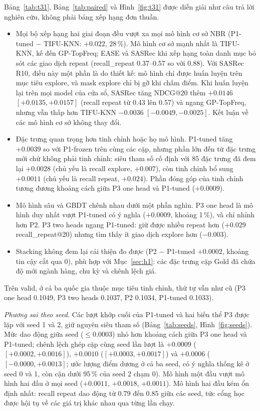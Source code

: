 \documentclass[jtehm]{ieeeaccess}
\begin{document}
Bảng~\ref{tab:t31}, Bảng~\ref{tab:paired} và Hình~\ref{fig:t31} được diễn giải như câu trả lời nghiên cứu, không phải bảng xếp hạng đơn thuần.
\begin{itemize}
\item Mọi bộ xếp hạng hai giai đoạn đều vượt xa mọi mô hình cơ sở NBR (P1-tuned $-$ TIFU-KNN: $+0.022$, 28\,\%). Mô hình cơ sở mạnh nhất là TIFU-KNN, kế đến GP-TopFreq; EASE và SASRec khi xếp hạng toàn danh mục bỏ sót các giao dịch repeat (recall\_repeat 0.37--0.57 so với 0.88). Với SASRec R10, điều này một phần là do thiết kế: mô hình chỉ được huấn luyện trên mục tiêu explore, và mask explore chỉ bị gỡ khi chấm điểm. Khi huấn luyện lại trên mọi model của cửa sổ, SASRec tăng NDCG@20 thêm $+0.0146$ $[+0.0135, +0.0157]$ (recall repeat từ 0.43 lên 0.57) và ngang GP-TopFreq, nhưng vẫn thấp hơn TIFU-KNN $-0.0036$ $[-0.0049, -0.0025]$. Kết luận về các mô hình cơ sở không thay đổi.
\item Đặc trưng quan trọng hơn tinh chỉnh hoặc họ mô hình. P1-tuned tăng $+0.0039$ so với P1-frozen trên cùng các cặp, nhưng phần lớn đến từ đặc trưng mới chứ không phải tinh chỉnh: siêu tham số cố định với 85 đặc trưng đã đem lại $+0.0028$ (chủ yếu là recall explore, $+0.007$), còn tinh chỉnh bổ sung $+0.0011$ (chủ yếu là recall repeat, $+0.024$). Phần đóng góp của tinh chỉnh tương đương khoảng cách giữa P3 one head và P1-tuned ($+0.0009$).
\item Mô hình sâu và GBDT chênh nhau dưới một phần nghìn. P3 one head là mô hình duy nhất vượt P1-tuned có ý nghĩa ($+0.0009$, khoảng 1\,\%), và chỉ nhỉnh hơn P2. P3 two heads ngang P1-tuned: giữ được nhiều repeat hơn ($+0.029$ recall\_repeat@20) nhưng tìm thấy ít giao dịch explore hơn ($-0.003$).
\item Stacking không đem lại cải thiện đo được (P2 $-$ P1-tuned $+0.0002$, khoảng tin cậy cắt qua 0), phù hợp với Mục~\ref{sec:h1}: các đặc trưng cặp Gold đã chứa độ mới ngành hàng, chu kỳ và chênh lệch giá.
\end{itemize}
Trên valid, ở cả ba quốc gia thuộc mục tiêu tinh chỉnh, thứ tự vẫn như cũ (P3 one head 0.1049, P3 two heads 0.1037, P2 0.1034, P1-tuned 0.1033).

\textit{Phương sai theo seed.} Các lượt khớp cuối của P1-tuned và hai biến thể P3 được lặp với seed 1 và 2, giữ nguyên siêu tham số (Bảng~\ref{tab:seeds}, Hình~\ref{fig:seeds}). Mức dao động giữa seed ($\le 0.0003$) nhỏ hơn khoảng cách giữa P3 one head và P1-tuned; chênh lệch ghép cặp cùng seed lần lượt là $+0.0009$ ($[+0.0002, +0.0016]$), $+0.0010$ ($[+0.0003, +0.0017]$) và $+0.0006$ ($[-0.0000, +0.0013]$; ước lượng điểm dương ở cả ba seed, có ý nghĩa thống kê ở seed 0 và 1, còn cận dưới 95\,\% của seed 2 chạm 0). Mô hình một đầu vượt mô hình hai đầu ở mọi seed ($+0.0011$, $+0.0018$, $+0.0011$). Mô hình hai đầu kém ổn định nhất: recall repeat dao động từ 0.79 đến 0.85 giữa các seed, tức cổng học được hội tụ về các giá trị khác nhau qua từng lần chạy.
\end{document}
